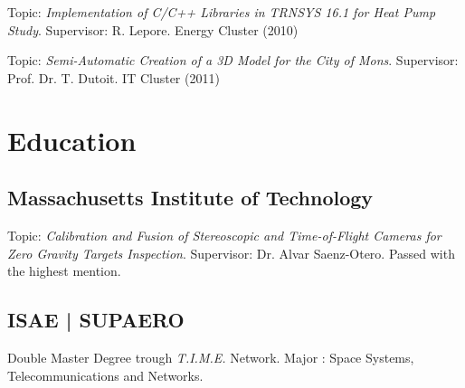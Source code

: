 \documentclass[a4paper]{deedy-resume} %
\begin{document}
\begin{minipage}[t]{0.73\textwidth}
\sectionspace %


\begin{tightitemize}
	\item Topic: \textit{Implementation of C/C++ Libraries in TRNSYS 16.1 for Heat Pump Study}. Supervisor: R. Lepore. Energy Cluster (2010)
	\item Topic: \textit{Semi-Automatic Creation of a 3D Model for the City of Mons}. Supervisor: Prof. Dr. T. Dutoit. IT Cluster (2011)
\end{tightitemize}



\section{Education}

\subsection{Massachusetts Institute of Technology}
\vspace{2pt}
Topic: \textit{Calibration and Fusion of Stereoscopic and Time-of-Flight Cameras for Zero Gravity Targets Inspection}. Supervisor: Dr. Alvar Saenz-Otero. Passed with the highest mention.

\sectionspace %


\subsection{ISAE | SUPAERO}
\vspace{2pt}
Double Master Degree trough \textit{T.I.M.E.} Network. Major : Space Systems, Telecommunications and Networks.

\sectionspace %


\end{minipage}
\end{document}
